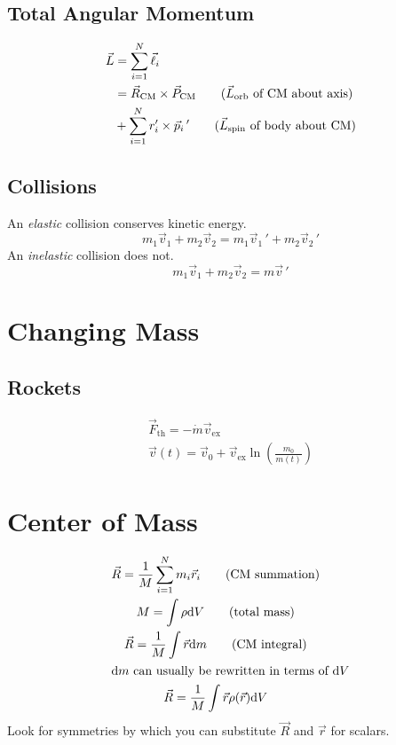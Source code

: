 \documentclass[tbtags]{cheatsheet}
\begin{document}
		\subsection{Total Angular Momentum}
		\begin{align*}
			\vec L &= \sum_{i=1}^{N} \vec\ell_i	\\
			&= \vec R_\text{CM} \times \vec P_\text{CM}	\tag{$\vec L_\text{orb}$ of CM about axis}\\
			&+ \sum_{i=1}^{N} r_i' \times \vec p_i\,'		\tag{$\vec L_\text{spin}$ of body about CM}
		\end{align*}
		\subsection{Collisions}
			An \emph{elastic} collision conserves kinetic energy.
			\[
				m_1\vec v_1 + m_2\vec v_2 = m_1\vec v_1\,' + m_2\vec v_2\,'
			\]
			An \emph{inelastic} collision does not.
			\[
				m_1\vec v_1 + m_2\vec v_2 = m\vec v\,'
			\]
	\section{Changing Mass}
		\subsection{Rockets}
			\begin{gather*}
				\vec F_\mathrm{th} = -\dot{m}\vec v_\mathrm{ex}		\tag{thrust}\\
				\vec v(t) = \vec v_0 + \vec v_\mathrm{ex}\ln\left( \frac{m_0}{m(t)} \right)	\tag{$\Delta V$}
			\end{gather*}
	\section{Center of Mass}
	\begin{gather*}
		\vec R = \frac{1}{M}\sum_{i=1}^N m_i \vec r_i	\tag{CM summation}\raisetag{-10pt}\\
		M = \int \rho \mathrm{d}V	\tag{total mass}\\
		\vec R =  \frac{1}{M}  \int \vec r \mathrm{d}m \tag{CM integral}\raisetag{-6pt}\\
	\intertext{$\mathrm{d}m$ can usually be rewritten in terms of $\mathrm{d}V$}
		\vec R = \frac{1}{M} \int \vec r \rho(\vec r) \mathrm{d}V
	\end{gather*}
	Look for symmetries by which you can substitute $\vec R$ and $\vec r$ for scalars.
\end{document}
